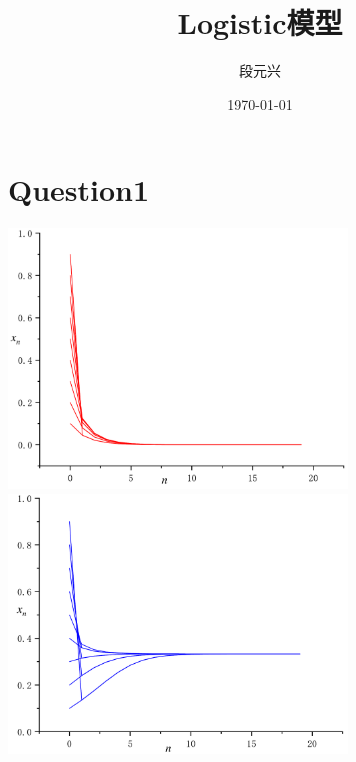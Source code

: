 \documentclass[UTF8]{ctexart}
\title{Logistic模型}
\author{段元兴}
\date{\today}
\begin{document}
\maketitle
\thispagestyle{empty}
\setcounter{page}{1}
\newpage
\tableofcontents
\newpage
    \section{Question1}
        \begin{center}
            \includegraphics[width=9cm]{r0_5.pdf}
            \includegraphics[width=9cm]{r1_5.pdf}
        \end{center}
\end{document}
